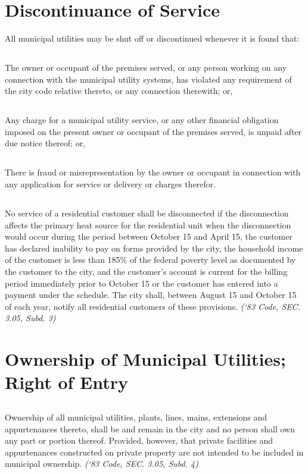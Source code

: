\section{Discontinuance of Service}
All municipal utilities may be shut off or discontinued whenever it is found that:
\subsection{}
The owner or occupant of the premises served, or any person working on any connection with the municipal utility systems, has violated any requirement of the city code relative thereto, or any connection therewith; or,
\subsection{}
Any charge for a municipal utility service, or any other financial obligation imposed on the present owner or occupant of the premises served, is unpaid after due notice thereof; or,
\subsection{}
There is fraud or misrepresentation by the owner or occupant in connection with any application for service or delivery or charges therefor.
\subsection{}
No service of a residential customer shall be disconnected if the disconnection affects the primary heat source for the residential unit when the disconnection would occur during the period between October 15 and April 15, the customer has declared inability to pay on forms provided by the city, the household income of the customer is less than 185\% of the federal poverty level as documented by the customer to the city, and the customer’s account is current for the billing period immediately prior to October 15 or the customer has entered into a payment under the schedule.  The city shall, between August 15 and October 15 of each year, notify all residential customers of these provisions.\newline
\emph{(‘83 Code, SEC. 3.05, Subd. 3)}
\section{Ownership of Municipal Utilities; Right of Entry}
\subsection{}
Ownership of all municipal utilities, plants, lines, mains, extensions and appurtenances thereto, shall be and remain in the city and no person shall own any part or portion thereof.  Provided, however, that private facilities and appurtenances constructed on private property are not intended to be included in municipal ownership.\newline
\emph{(‘83 Code, SEC. 3.05, Subd. 4)}
